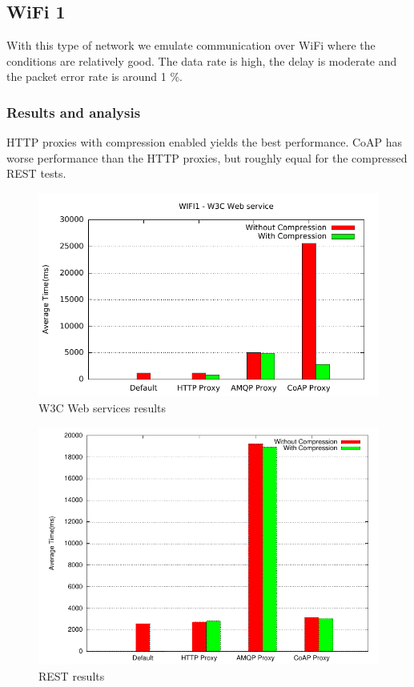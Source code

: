 \subsection{WiFi 1}

With this type of network we emulate communication over WiFi where the
conditions are relatively good. The data rate is high, the delay is moderate
and the packet error rate is around 1 \%.

\subsubsection{Results and analysis}

HTTP proxies with compression enabled yields the best performance. CoAP has
worse performance than the HTTP proxies, but roughly equal for the compressed
REST tests.


\begin{figure}[H]
\center
\includegraphics[scale=0.75]{../results/wifi1/nffi/out.pdf}
\caption{W3C Web services results}
\end{figure}

\begin{figure}[H]
\center
\includegraphics[scale=0.75]{../results/wifi1/rest/result.pdf}
\caption{REST results}
\end{figure}


